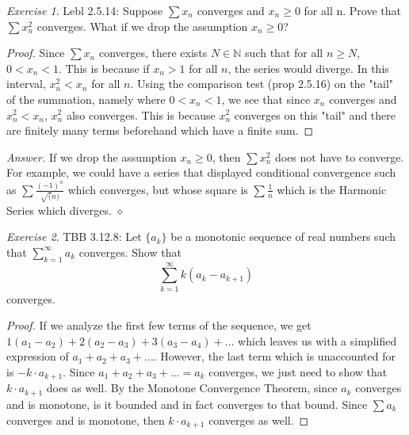 \documentclass[12pt,oneside]{amsart}
\theoremstyle{definition}
\theoremstyle{remark}
\newtheorem{exer}{Exercise}
\numberwithin{equation}{exer}
\newenvironment{answer}{\bigskip\noindent\emph{Answer.}}{\hfill$\diamond$\newline}
\begin{document}
\newpage
\begin{exer}
Lebl 2.5.14: Suppose $\sum x_n$ converges and $x_n\geq 0$ for all n. Prove that $\sum x_n^2$ converges. What if we drop the assumption $x_n\geq 0$?
\end{exer}
\begin{proof}
Since $\sum x_n$ converges, there exists $N\in\mathbb{N}$ such that for all $n\geq N$, $0<x_n<1$. This is because if $x_n>1$ for all $n$, the series would diverge. In this interval, $x_n^2<x_n$ for all $n$. Using the comparison test (prop 2.5.16) on the "tail" of the summation, namely where $0<x_n<1$, we see that since $x_n$ converges and $x_n^2<x_n$, $x_n^2$ also converges. This is because $x_n^2$ converges on this "tail" and there are finitely many terms beforehand which have a finite sum.
\end{proof}
\begin{answer}
If we drop the assumption $x_n\geq 0$, then $\sum x_n^2$ does not have to converge. For example, we could have a series that displayed conditional convergence such as $\sum \frac{(-1)^n}{\sqrt(n)}$ which converges, but whose square is $\sum\frac{1}{n}$ which is the Harmonic Series which diverges.
\end{answer}

\newpage
\begin{exer}
TBB 3.12.8: Let $\{a_k\}$ be a monotonic sequence of real numbers such that $\sum_{k=1}^{\infty}a_k$ converges. Show that
$$\sum_{k=1}^{\infty}k(a_k-a_{k+1})$$
converges.
\end{exer}
\begin{proof}
If we analyze the first few terms of the sequence, we get $1(a_1-a_2)+2(a_2-a_3)+3(a_3-a_4)+...$ which leaves us with a simplified expression of $a_1+a_2+a_3+...$. However, the last term which is unaccounted for is $-k\cdot a_{k+1}$. Since $a_1+a_2+a_3+...=a_k$ converges, we just need to show that $k\cdot a_{k+1}$ does as well. By the Monotone Convergence Theorem, since $a_k$ converges and is monotone, is it bounded and in fact converges to that bound. Since $\sum a_k$ converges and is monotone, then $k\cdot a_{k+1}$ converges as well. 
\end{proof}
\end{document}
